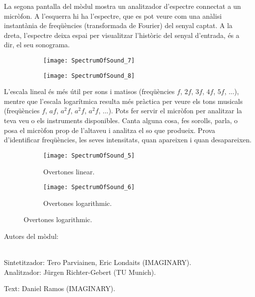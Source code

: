La segona pantalla del mòdul mostra un analitzador d'espectre connectat a un micròfon. A l'esquerra hi ha l'espectre, que es pot veure com una anàlisi instantània de freqüències (transformada de Fourier) del senyal captat. A la dreta, l'espectre deixa espai per visualitzar l'històric del senyal d'entrada, és a dir, el seu sonograma.

\begin{figure}[h]
\centering
\begin{subfigure}{0.45\textwidth}
\centering
\texttt{[image: SpectrumOfSound\_7]}
\end{subfigure}
\begin{subfigure}{0.45\textwidth}
\centering
\texttt{[image: SpectrumOfSound\_8]}
\end{subfigure}
\end{figure}

L'escala lineal és més útil per sons i matisos (freqüències $f$, $2f$, $3f$, $4f$, $5f$, ...), mentre que l'escala logarítmica resulta més pràctica per veure els tons musicals (freqüències $f$, $af$, $a^2 f$, $a^2 f$, $a^2 f$, ...). Pots fer servir el micròfon per analitzar la teva veu o els instruments disponibles. Canta alguna cosa, fes sorolls, parla, o posa el micròfon prop de l'altaveu i analitza el so que produeix. Prova d'identificar freqüències, les seves intensitats, quan apareixen i quan desapareixen.

\begin{figure}[h]
\centering
\begin{subfigure}{0.45\textwidth}
\centering
\texttt{[image: SpectrumOfSound\_5]}
\caption*{Overtones linear.}
\end{subfigure}
\begin{subfigure}{0.45\textwidth}
\centering
\texttt{[image: SpectrumOfSound\_6]}
\caption*{Overtones logarithmic.}
\end{subfigure}
\end{figure}


\begin{sectcredits}

\item[Autors del mòdul:]\strut \\
Sintetitzador: Tero Parviainen, Eric Londaits (IMAGINARY). \\
Analitzador: Jürgen Richter-Gebert (TU Munich). \\

\item[Text:] Daniel Ramos (IMAGINARY).

\end{sectcredits}
